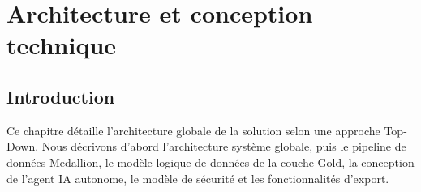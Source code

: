 \documentclass[a4paper,12pt]{report}
\begin{document}
\newpage
\chapter{Architecture et conception technique}

\section*{Introduction}
\begin{doublespace}
Ce chapitre détaille l'architecture globale de la solution selon une approche Top-Down. Nous décrivons d'abord l'architecture système globale, puis le pipeline de données Medallion, le modèle logique de données de la couche Gold, la conception de l'agent IA autonome, le modèle de sécurité et les fonctionnalités d'export.
\end{doublespace}
\end{document}
